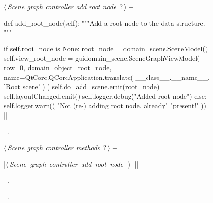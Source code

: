 \documentclass[%
    a4paper,    %
    justified,  %
    nobib,      %
    openany     %
]{tufte-book}
\begin{document}
\begin{figure}
\begin{flushleft} \small
\begin{minipage}{\linewidth}\label{scrap27}\raggedright\small
{} $\langle\,${\itshape Scene graph controller add root node}\nobreak\ {\footnotesize {?}}$\,\rangle\equiv$
\vspace{-1ex}
\begin{pythoncode}
def add_root_node(self):
    """Add a root node to the data structure.
    """

    if self.root_node is None:
        root_node = domain_scene.SceneModel()
        self.view_root_node = guidomain_scene.SceneGraphViewModel(
            row=0,
            domain_object=root_node,
            name=QtCore.QCoreApplication.translate(
                __class__.__name__, 'Root scene'
            )
        )
        self.do_add_scene.emit(root_node)
        self.layoutChanged.emit()
        self.logger.debug("Added root node")
    else:
        self.logger.warn((
            "Not (re-) adding root node, already"
            "present!"
        ))
|\NWsep|
\end{pythoncode}
\vspace{1.5ex}
\footnotesize
\begin{list}{}{\setlength{\itemsep}{-\parsep}\setlength{\itemindent}{-\leftmargin}}
\item \NWtxtMacroRefIn\ .

\item{}
\end{list}
\end{minipage}\vspace{4ex}
\end{flushleft}
\begin{flushleft} \small
\begin{minipage}{\linewidth}\label{scrap28}\raggedright\small
{} $\langle\,${\itshape Scene graph controller methods}\nobreak\ {\footnotesize {?}}$\,\rangle\equiv$
\vspace{-1ex}
\begin{pythoncode}
|\hbox{$\langle\,${\itshape Scene graph controller add root node}\nobreak\ {\footnotesize {}}$\,\rangle$}|
|\NWsep|
\end{pythoncode}
\vspace{1.5ex}
\footnotesize
\begin{list}{}{\setlength{\itemsep}{-\parsep}\setlength{\itemindent}{-\leftmargin}}
\item \NWtxtMacroDefBy\ .
\item \NWtxtMacroRefIn\ .


\end{list}
\end{minipage}
\end{flushleft}
\end{figure}
\end{document}
